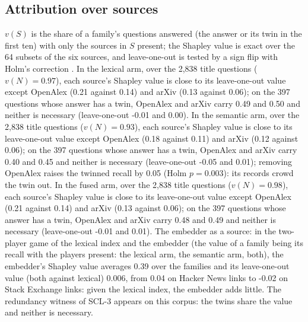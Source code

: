 \documentclass[11pt]{article}
\theoremstyle{plain}
\theoremstyle{definition}
\theoremstyle{remark}
\begin{document}
\subsection{Attribution over sources}
$v(S)$ is the share of a family's questions answered (the answer or its twin in the first ten) with
only the sources in $S$ present; the Shapley value is exact over the 64 subsets of the six sources,
and leave-one-out is tested by a sign flip with Holm's correction \citep{holm1979simple}. In the lexical arm, over the 2,838 title questions ($v(N) = 0.97$), each source's Shapley value is close to its leave-one-out value except OpenAlex (0.21 against 0.14) and arXiv (0.13 against 0.06); on the 397 questions whose answer has a twin, OpenAlex and arXiv carry 0.49 and 0.50 and neither is necessary (leave-one-out -0.01 and 0.00). In the semantic arm, over the 2,838 title questions ($v(N) = 0.93$), each source's Shapley value is close to its leave-one-out value except OpenAlex (0.18 against 0.11) and arXiv (0.12 against 0.06); on the 397 questions whose answer has a twin, OpenAlex and arXiv carry 0.40 and 0.45 and neither is necessary (leave-one-out -0.05 and 0.01); removing OpenAlex raises the twinned recall by 0.05 (Holm $p = 0.003$): its records crowd the twin out. In the fused arm, over the 2,838 title questions ($v(N) = 0.98$), each source's Shapley value is close to its leave-one-out value except OpenAlex (0.21 against 0.14) and arXiv (0.13 against 0.06); on the 397 questions whose answer has a twin, OpenAlex and arXiv carry 0.48 and 0.49 and neither is necessary (leave-one-out -0.01 and 0.01). The embedder as a source: in the two-player game of the lexical index and the embedder (the value of a family being its recall with the players present: the lexical arm, the semantic arm, both), the embedder's Shapley value averages 0.39 over the families and its leave-one-out value (both against lexical) 0.006, from 0.04 on Hacker News links to -0.02 on Stack Exchange links: given the lexical index, the embedder adds little.
The redundancy witness of SCL-3 appears on this corpus: the twins share the value and neither is
necessary.
\end{document}
